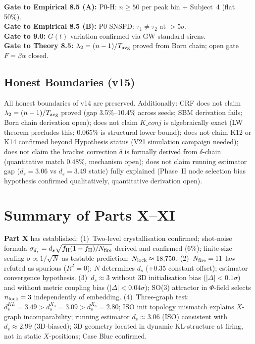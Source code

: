 \documentclass[12pt, a4paper]{article}
\begin{document}
\begin{center}
\textbf{Gate to Empirical 8.5 (A):} P0-H: $n\geq 50$ per peak bin + Subject~4 (flat 50\%).\\
\textbf{Gate to Empirical 8.5 (B):} P0 SNSPD: $\tau_1\neq\tau_2$ at $>5\sigma$.\\
\textbf{Gate to 9.0:} $G(t)$ variation confirmed via GW standard sirens.\\
\textbf{Gate to Theory 8.5:} $\lambda_2=(n-1)/T_{\rm avg}$ proved from Born chain; open gate $F=\beta\alpha$ closed.
\end{center}

\subsection{Honest Boundaries (v15)}

All honest boundaries of v14 are preserved. Additionally:
CRF does not claim $\lambda_2=(n-1)/T_{\rm avg}$ proved (gap 3.5\%--10.4\% across seeds; SBM derivation fails; Born chain derivation open);
does not claim $K\_conj$ is algebraically exact (LW theorem precludes this; 0.065\% is structural lower bound);
does not claim K12 or K14 confirmed beyond Hypothesis status (V21 simulation campaign needed);
does not claim the bracket correction $\delta$ is formally derived from $\delta$-chain (quantitative match $0.48\%$, mechanism open);
does not claim running estimator gap ($d_s=3.06$ vs $d_s=3.49$ static) fully explained (Phase~II node selection bias hypothesis confirmed qualitatively, quantitative derivation open).

\section{Summary of Parts X--XI}

\textbf{Part X} has established: (1)~Two-level crystallisation confirmed; shot-noise formula $\sigma_{d_s}=d_s\sqrt{f_{\rm II}(1-f_{\rm II})/N_{\rm fire}}$ derived and confirmed (6\%); finite-size scaling $\sigma\propto 1/\sqrt{N}$ as testable prediction; $N_{\rm lock}\approx 18{,}750$.
(2)~$N_{\rm fire}=11$ law refuted as spurious ($R^2=0$); $N$ determines $d_s$ (+0.35 constant offset); estimator convergence hypothesis.
(3)~$d_s\approx 3$ without 3D initialisation bias ($|\Delta|<0.1\sigma$) and without metric coupling bias ($|\Delta|<0.04\sigma$); SO(3) attractor in $\Phi$-field selects $n_{\rm lock}=3$ independently of embedding.
(4)~Three-graph test: $d_s^{KL}=3.49>d_s^{X_3}=3.09>d_s^{X_8}=2.80$; ISO init topology mismatch explains $X$-graph incomparability; running estimator $d_s\approx 3.06$ (ISO) consistent with $d_s\approx 2.99$ (3D-biased); 3D geometry located in dynamic KL-structure at firing, not in static $X$-positions; Case Blue confirmed.
\end{document}
